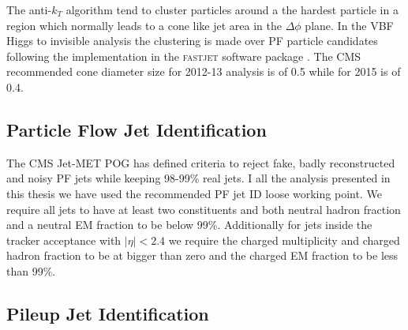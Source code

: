 The anti-$k_T$ algorithm tend to cluster particles around a the hardest particle in a region which normally leads to a cone like jet area in the $\Delta\phi$ plane. In the \gls{VBF} Higgs to invisible analysis the clustering is made over \gls{PF} particle candidates following the implementation in the \textsc{fastjet} software package \cite{ARTICLE:FastJetUserManual}. The \gls{CMS} recommended cone diameter size for 2012-13 analysis is of 0.5 while for 2015 is of 0.4.


\subsection{Particle Flow Jet Identification} 
\label{SECTION:EventReconstructionAndSimulation_Jets_ParticleFlowJetID}



The \gls{CMS} Jet-MET \gls{POG} has defined criteria to reject fake, badly reconstructed and noisy \gls{PF} jets while keeping 98-99\% real jets. I all the analysis presented in this thesis we have used the recommended \gls{PF} jet \gls{ID} loose working point. We require all jets to have at least two constituents and both neutral hadron fraction and a neutral \gls{EM} fraction to be below 99\%. Additionally for jets inside the tracker acceptance with $|\eta| < 2.4$ we require the charged multiplicity and charged hadron fraction to be at bigger than zero and the charged \gls{EM} fraction to be less than 99\%.

\subsection{Pileup Jet Identification}
\label{SECTION:EventReconstructionAndSimulation_Jets_PileupJetID}



